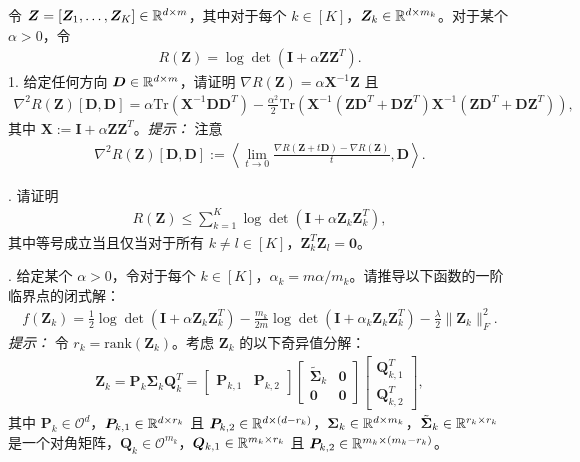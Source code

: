 \documentclass[../../book-main.tex]{subfiles}
\begin{document}
\begin{exercise}
    令 $\bm Z = [\bm Z_1,\dots,\bm Z_K] \in \mathbb{R}^{d\times m}$，其中对于每个 $k \in [K]$，$\bm Z_k \in \mathbb{R}^{d\times m_k}$。对于某个 $\alpha > 0$，令
    \begin{align*}
        R(\bm Z) = \log\det\left(\bm I + \alpha\bm Z\bm Z^T \right).
    \end{align*}
1. 给定任何方向 $\bm D \in \mathbb{R}^{d\times m}$，请证明 $\nabla R(\bm Z) = \alpha\bm X^{-1}\bm Z$ 且
    \begin{align*}
 \nabla^2 R(\bm Z)[\bm D, \bm D] =\alpha \mathrm{Tr}\left( \bm X^{-1}\bm D\bm D^T\right) - \frac{\alpha^2}{2}\mathrm{Tr}\left(\bm X^{-1}\left( \bm Z\bm D^T+\bm D\bm Z^T\right) \bm X^{-1}\left( \bm Z\bm D^T+\bm D\bm Z^T\right)\right),
    \end{align*}
    其中 $\bm X := \bm I + \alpha\bm Z\bm Z^T$。{\em 提示：} 注意
    \begin{align*}
        \nabla^2 R(\bm Z)[\bm D, \bm D] := \left\langle \lim_{t \to 0} \frac{\nabla R(\bm Z+ t\bm D) - \nabla R(\bm Z)}{t}, \bm D \right\rangle.
    \end{align*}

. 请证明
\begin{align*}
    R(\bm Z) \le \sum_{k=1}^K \log\det\left(\bm I + \alpha\bm Z_k\bm Z_k^T \right),
\end{align*}
其中等号成立当且仅当对于所有 $k \neq l \in [K]$，$\bm Z_k^T\bm Z_l = \bm 0$。
\medskip

. 给定某个 $\alpha >0$，令对于每个 $k \in [K]$，$\alpha_k=m\alpha/m_k$。请推导以下函数的一阶临界点的闭式解：
\begin{align*}
    f(\bm Z_k) = \frac{1}{2}\log\det\left(\bm I + \alpha\bm Z_k\bm Z_k^T \right) - \frac{m_k}{2m}\log\det\left(\bm I + \alpha_k \bm Z_k\bm Z_k^T \right) - \frac{\lambda}{2}\|\bm Z_k\|_F^2.
\end{align*}
{\em 提示：} 令 $r_k=\mathrm{rank}(\bm Z_k)$。考虑 $\bm Z_k$ 的以下奇异值分解：
\begin{align*}
    \bm Z_k = \bm P_k\bm \Sigma_k\bm Q_k^T = \begin{bmatrix}
        \bm P_{k,1} & \bm P_{k,2}
    \end{bmatrix} \begin{bmatrix}
        \tilde{\bm \Sigma}_{k} & \bm 0 \\
        \bm 0 & \bm 0
    \end{bmatrix}
    \begin{bmatrix}
        \bm Q_{k,1}^T \\ \bm Q_{k,2}^T
    \end{bmatrix},
\end{align*}
其中 $\bm P_k \in \mathcal{O}^d$，$\bm P_{k,1} \in \mathbb{R}^{d\times r_k}$ 且 $\bm P_{k,2} \in \mathbb{R}^{d\times (d-r_k)}$，$\bm \Sigma_k \in \mathbb{R}^{d\times m_k}$，$\tilde{\bm \Sigma}_{k} \in \mathbb{R}^{r_k\times r_k}$ 是一个对角矩阵，$\bm Q_k \in \mathcal{O}^{m_k}$，$\bm Q_{k,1} \in \mathbb{R}^{m_k\times r_k}$ 且 $\bm P_{k,2} \in \mathbb{R}^{m_k \times (m_k-r_k)}$。
\medskip

\end{exercise}
\end{document}
